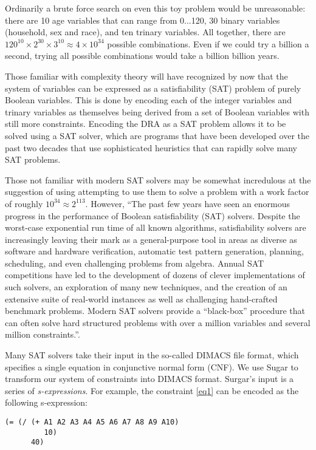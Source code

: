 \documentclass[runningheads]{llncs}
\begin{document}
Ordinarily a brute force search on even this toy problem would be
unreasonable: there are 10 age variables that can range from 0...120,
30 binary variables (household, sex and race), and ten trinary
variables. All together, there are $120^{10} \times 2^{30} \times
3^{10} \approx 4 \times 10^{34}$ possible combinations. Even if we
could try a billion a second, trying all possible combinations would
take a billion billion years.

Those familiar with complexity theory will have recognized by now that
the system of variables can be expressed as a satisfiability (SAT)
problem of purely Boolean variables. This is done by encoding each of the
integer variables and trinary variables as themselves being derived
from a set of Boolean variables with still more constraints. Encoding
the DRA as a SAT problem allows it to be solved using a SAT solver, which are 
programs that have been developed over the past two
decades that use sophisticated heuristics that can rapidly solve many
SAT problems.

Those not familiar with modern SAT solvers may be somewhat
incredulous at the suggestion of using attempting to use them to solve
a problem with a work factor of roughly $10^{34}\approx2^{113}$.
However, ``The past few years have seen an enormous progress in the performance
of Boolean satisfiability (SAT) solvers. Despite the worst-case
exponential run time of all known algorithms, satisfiability solvers
are increasingly leaving their mark as a general-purpose tool in areas
as diverse as software and hardware verification,
automatic test pattern generation, planning,
scheduling, and even challenging problems from algebra. Annual SAT
competitions have led to the development of dozens
of clever implementations of such solvers, an exploration of many new
techniques, and the creation of an extensive suite of real-world
instances as well as challenging hand-crafted benchmark
problems. Modern SAT solvers provide a ``black-box'' procedure that
can often solve hard structured problems with over a million variables and
several million constraints.''\cite[references omitted]{Gomes200889}.

Many SAT solvers take their input in the so-called DIMACS file format,
which specifies a single equation in conjunctive normal form (CNF). We use
Sugar\cite{sugar} to transform our system of constraints into DIMACS
format. Surgar's input is a series of
\textit{s-expressions}\cite{McCarthy:1960:RFS:367177.367199}. For
example, the constraint \ref{eq1} can be encoded as the following
s-expression:
\begin{verbatim}
(= (/ (+ A1 A2 A3 A4 A5 A6 A7 A8 A9 A10)
         10)
      40)
\end{verbatim}
\end{document}
